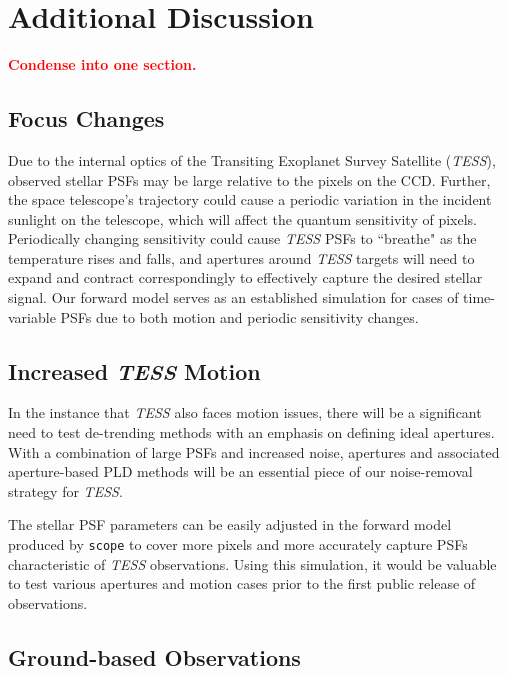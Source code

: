 \documentclass[12pt,preprint]{aastex}
\begin{document}
\section{Additional Discussion}

\textcolor{red}{\textbf{Condense into one section.}}

\subsection{Focus Changes}

Due to the internal optics of the Transiting Exoplanet Survey Satellite (\textit{TESS}), observed stellar PSFs may be large relative to the pixels on the CCD. Further, the space telescope's trajectory could cause a periodic variation in the incident sunlight on the telescope, which will affect the quantum sensitivity of pixels. Periodically changing sensitivity could cause \textit{TESS} PSFs to ``breathe" as the temperature rises and falls, and apertures around \textit{TESS} targets will need to expand and contract correspondingly to effectively capture the desired stellar signal. Our forward model serves as an established simulation for cases of time-variable PSFs due to both motion and periodic sensitivity changes.


\subsection{Increased \textit{TESS} Motion}

In the instance that \textit{TESS} also faces motion issues, there will be a significant need to test de-trending methods with an emphasis on defining ideal apertures. With a combination of large PSFs and increased noise, apertures and associated aperture-based PLD methods will be an essential piece of our noise-removal strategy for \textit{TESS}.

The stellar PSF parameters can be easily adjusted in the forward model produced by \texttt{scope} to cover more pixels and more accurately capture PSFs characteristic of \textit{TESS} observations. Using this simulation, it would be valuable to test various apertures and motion cases prior to the first public release of observations.

\subsection{Ground-based Observations}
\end{document}
